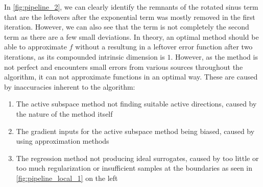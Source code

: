 \documentclass[
  a4paper,  %
  twoside,  %
  bibliography=totoc,
  headsepline,
  cleardoublepage=empty,
  parskip=half,
  draft=false
]{scrbook}
\begin{document}
%
In \cref{fig:pipeline_2}, we can clearly identify the remnants of the rotated sinus term that are the leftovers after the exponential term was mostly removed in the first iteration.
However, we can also see that the term is not completely the second term as there are a few small deviations.
In theory, an optimal method should be able to approximate $f$ without a resultung in a leftover error function after two iterations, as its compounded intrinsic dimension is $1$.
However, as the method is not perfect and encounters small errors from various sources throughout the algorithm, it can not approximate functions in an optimal way.
These are caused by inaccuracies inherent to the algorithm:
\begin{enumerate}
\item The active subspace method not finding suitable active directions, caused by the nature of the method itself
\item The gradient inputs for the active subspace method being biased, caused by using approximation methods
\item The regression method not producing ideal surrogates, caused by too little or too much regularization or insufficient samples at the boundaries as seen in \cref{fig:pipeline_local_1} on the left
\end{enumerate}
\end{document}
